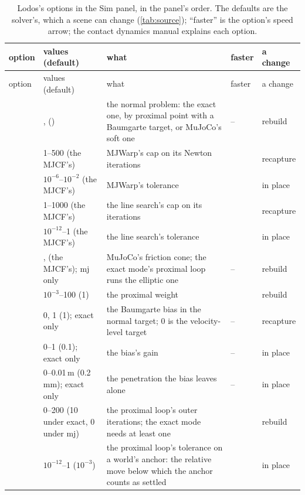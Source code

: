 \begingroup\small
\begin{longtable}{@{}L{29mm}L{26mm}L{62mm}L{11mm}L{16mm}@{}}
\caption{Lodos's options in the Sim panel, in the panel's order. The defaults are the solver's, which a scene can change (\cref{tab:source}); ``faster'' is the option's speed arrow; the contact dynamics manual explains each option.}\label{tab:options}\\
\toprule
option & values (default) & what & faster & a change \\
\midrule
\endfirsthead
\toprule
option & values (default) & what & faster & a change \\
\midrule
\endhead
{} & ,  () & the normal problem: the exact one, by proximal point with a Baumgarte target, or MuJoCo's soft one & -- & rebuild \\
 & 1--500 (the MJCF's) & MJWarp's cap on its Newton iterations &  & recapture \\
 & $10^{-6}$--$10^{-2}$ (the MJCF's) & MJWarp's tolerance & \code{^} & in place \\
 & 1--1000 (the MJCF's) & the line search's cap on its iterations &  & recapture \\
 & $10^{-12}$--1 (the MJCF's) & the line search's tolerance & \code{^} & in place \\
 & ,  (the MJCF's); mj only & MuJoCo's friction cone; the exact mode's proximal loop runs the elliptic one & -- & rebuild \\
 & $10^{-3}$--100 (1) & the proximal weight & \code{<>} & rebuild \\
 & 0, 1 (1); exact only & the Baumgarte bias in the normal target; 0 is the velocity-level target & -- & recapture \\
 & 0--1 (0.1); exact only & the bias's gain & -- & in place \\
 & 0--0.01\,m (0.2\,mm); exact only & the penetration the bias leaves alone & -- & in place \\
 & 0--200 (10 under exact, 0 under mj) & the proximal loop's outer iterations; the exact mode needs at least one &  & rebuild \\
 & $10^{-12}$--1 ($10^{-3}$) & the proximal loop's tolerance on a world's anchor: the relative move below which the anchor counts as settled & \code{^} & in place \\

\end{longtable}
